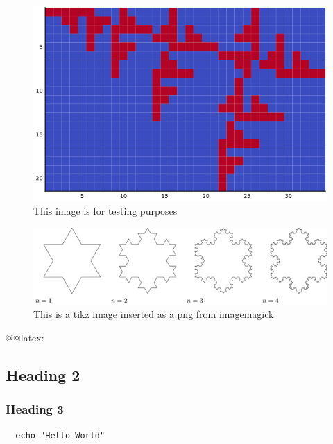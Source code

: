 \documentclass[11pt]{article}
\begin{document}
\begin{figure}[htbp]
\centering
\includegraphics[width=12cm]{media/my-self-rep-frac.png}
\caption{\label{testim}This image is for testing purposes \cite{moskowitzLibraryGuidesWikipedia}}
\end{figure}

\begin{figure}[htbp]
\centering
\includegraphics[width=12cm]{media/tikz/Snowflake.png}
\caption{\label{testtikzins}This is a tikz image inserted as a png from imagemagick}
\end{figure}


@@latex: 



\subsection{Heading 2}
\label{heading-2}
\subsubsection{Heading 3}
\label{heading-3}
\begin{verbatim}
  echo "Hello World"
\end{verbatim}
\end{document}
